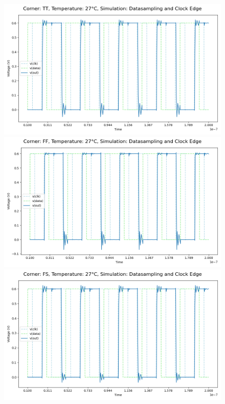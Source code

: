 \begin{figure}[H]
    \centering
    \includegraphics[height= 0.21\textheight]{figures/aimspice/0.600_0.1u_0.1u_0.3u_0.1u/functionality/TT27W1.png}
    \vspace{5pt}
    \includegraphics[height= 0.21\textheight]{figures/aimspice/0.600_0.1u_0.1u_0.3u_0.1u/functionality/FF27W1.png}
    \vspace{5pt}
    \includegraphics[height= 0.21\textheight]{figures/aimspice/0.600_0.1u_0.1u_0.3u_0.1u/functionality/FS27W1.png}

\end{figure}
